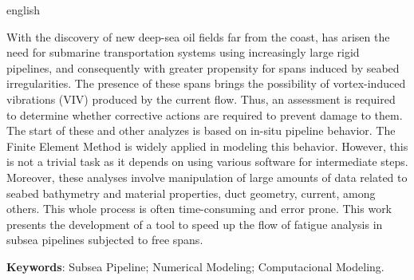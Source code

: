 \begin{resumo}[Abstract]
    \begin{otherlanguage*}{english}
    
    With the discovery of new deep-sea oil fields far from the coast, has arisen the need for submarine transportation systems using increasingly large rigid pipelines, and consequently with greater propensity for spans induced by seabed irregularities. The presence of these spans brings the possibility of vortex-induced vibrations (VIV) produced by the current flow. Thus, an assessment is required to determine whether corrective actions are required to prevent damage to them. The start of these and other analyzes is based on in-situ pipeline behavior. The Finite Element Method is widely applied in modeling this behavior. However, this is not a trivial task as it depends on using various software for intermediate steps. Moreover, these analyses involve manipulation of large amounts of data related to seabed bathymetry and material properties, duct geometry, current, among others. This whole process is often time-consuming and error prone. This work presents the development of a tool to speed up the flow of fatigue analysis in subsea pipelines subjected to free spans.

    \vspace{\onelineskip}

    \noindent
    \textbf{Keywords}: Subsea Pipeline; Numerical Modeling; Computacional Modeling.
    \end{otherlanguage*}
\end{resumo}